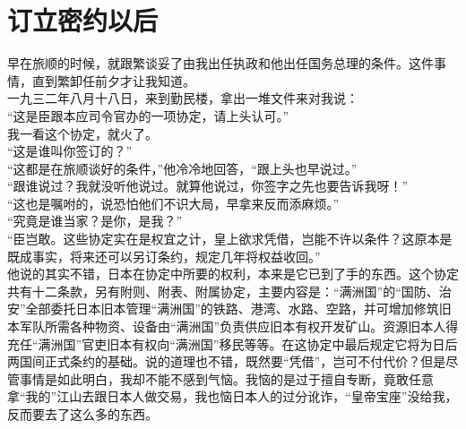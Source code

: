 \fancyhead[RO]{} %
\fancyhead[LE]{} %
\chapter*{订立密约以后}
\thispagestyle{empty}
早在旅顺的时候，就跟繁谈妥了由我出任执政和他出任国务总理的条件。这件事情，直到繁卸任前夕才让我知道。\\

一九三二年八月十八日，来到勤民楼，拿出一堆文件来对我说：\\

“这是臣跟本应司令官办的一项协定，请上头认可。”\\

我一看这个协定，就火了。\\

“这是谁叫你签订的？”\\

“这都是在旅顺谈好的条件，”他冷冷地回答，“跟上头也早说过。”\\

“跟谁说过？我就没听他说过。就算他说过，你签字之先也要告诉我呀！”\\

“这也是嘱咐的，说恐怕他们不识大局，早拿来反而添麻烦。”\\

“究竟是谁当家？是你，是我？”\\

“臣岂敢。这些协定实在是权宜之计，皇上欲求凭借，岂能不许以条件？这原本是既成事实，将来还可以另订条约，规定几年将权益收回。”\\

他说的其实不错，日本在协定中所要的权利，本来是它已到了手的东西。这个协定共有十二条款，另有附则、附表、附属协定，主要内容是：“满洲国”的“国防、治安”全部委托日本旧本管理“满洲国”的铁路、港湾、水路、空路，并可增加修筑旧本军队所需各种物资、设备由“满洲国”负责供应旧本有权开发矿山。资源旧本人得充任“满洲国”官吏旧本有权向“满洲国”移民等等。在这协定中最后规定它将为日后两国间正式条约的基础。说的道理也不错，既然要“凭借”，岂可不付代价？但是尽管事情是如此明白，我却不能不感到气恼。我恼的是过于擅自专断，竟敢任意拿“我的”江山去跟日本人做交易，我也恼日本人的过分讹诈，“皇帝宝座”没给我，反而要去了这么多的东西。\\

